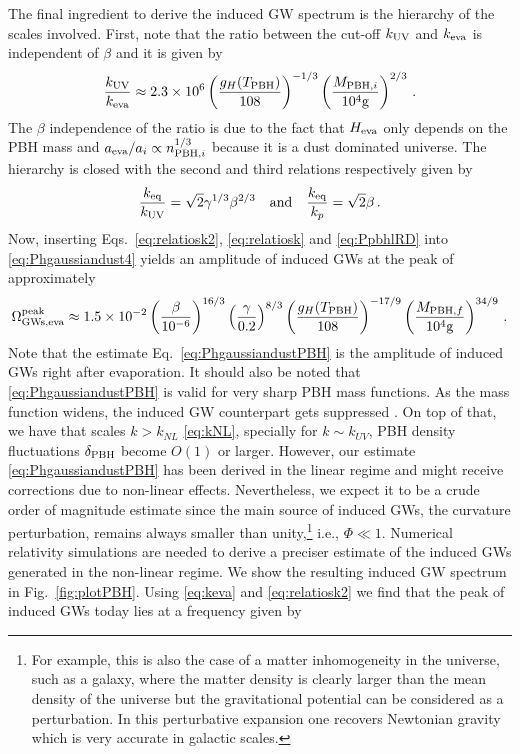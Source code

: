 \documentclass[a4paper,11pt]{article}
\numberwithin{equation}{section}
\begin{document}
The final ingredient to derive the induced GW spectrum is the hierarchy of the scales involved. First, note that the ratio between the cut-off $k_{\rm UV}$ and $k_{\rm eva}$ is independent of $\beta$ and it is given by \cite{Domenech:2020ssp}
\begin{align}\label{eq:relatiosk2}
\frac{k_{\rm UV}}{k_{\rm eva}}\approx {2.3}\times 10^6
 \left(\frac{g_H(T_{\rm PBH})}{108}\right)^{-1/3}\left(\frac{M_{{\rm PBH},i}}{10^4{\rm g}}\right)^{2/3}\,.
\end{align}
The $\beta$ independence of the ratio is due to the fact that $H_{\rm eva}$ only depends on the PBH mass and $a_{\rm eva}/a_i\propto n_{{\rm PBH},i}^{1/3}$ because it is a dust dominated universe. The hierarchy is closed with the second and third relations respectively given by \cite{Domenech:2020ssp}
\begin{align}\label{eq:relatiosk}
\frac{k_{\rm eq}}{k_{\rm UV}}={\sqrt{2}\gamma^{1/3}\beta^{2/3}}\quad{\rm and}\quad\frac{k_{\rm eq}}{k_p}={\sqrt{2}\beta}\,.
\end{align}
Now, inserting Eqs.~\eqref{eq:relatiosk2}, \eqref{eq:relatiosk} and \eqref{eq:PpbhlRD} into \eqref{eq:Phgaussiandust4} yields an amplitude of induced GWs at the peak of approximately
\begin{align}\label{eq:PhgaussiandustPBH}
\Omega^{\rm peak}_{\rm GWs,eva}\approx 1.5\times10^{-2}\left(\frac{\beta}{10^{-6}}\right)^{16/3}\left(\frac{\gamma}{0.2}\right)^{8/3}\left(\frac{g_H(T_{\rm PBH})}{108}\right)^{-17/9}
\left(\frac{M_{{\rm PBH},f}}{10^4{\rm g}}\right)^{34/9}\,.
\end{align}
Note that the estimate Eq.~\eqref{eq:PhgaussiandustPBH} is the amplitude of induced GWs right after evaporation. It should also be noted that \eqref{eq:PhgaussiandustPBH} is valid for very sharp PBH mass functions. As the mass function widens, the induced GW counterpart gets suppressed \cite{Inomata:2020lmk}. On top of that, we have that scales $k>k_{NL}$ \eqref{eq:kNL}, specially for $k\sim k_{UV}$, PBH density fluctuations $\delta_{\rm PBH}$ become $O(1)$ or larger. However, our estimate \eqref{eq:PhgaussiandustPBH} has been derived in the linear regime and might receive corrections due to non-linear effects. Nevertheless, we expect it to be a crude order of magnitude estimate since the main source of induced GWs, the curvature perturbation, remains always smaller than unity,\footnote{For example, this is also the case of a matter inhomogeneity in the universe, such as a galaxy, where the matter density is clearly larger than the mean density of the universe but the gravitational potential can be considered as a perturbation. In this perturbative expansion one recovers Newtonian gravity which is very accurate in galactic scales.} i.e., $\Phi\ll1$. Numerical relativity simulations are needed to derive a preciser estimate of the induced GWs generated in the non-linear regime. We show the resulting induced GW spectrum in Fig.~\ref{fig:plotPBH}. Using \eqref{eq:keva} and \eqref{eq:relatiosk2} we find that the peak of induced GWs today lies at a frequency given by
\end{document}
